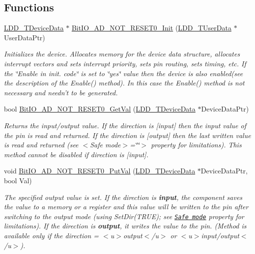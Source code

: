 \subsection*{Functions}
\begin{DoxyCompactItemize}
\item 
\hyperlink{group___p_e___types__module_gac5cf1362f1f0e3a2ce71b1bf2276d091}{L\-D\-D\-\_\-\-T\-Device\-Data} $\ast$ \hyperlink{group___bit_i_o___a_d___n_o_t___r_e_s_e_t0__module_gab0dee5e91bce634f9f86a6c6bedbae51}{Bit\-I\-O\-\_\-\-A\-D\-\_\-\-N\-O\-T\-\_\-\-R\-E\-S\-E\-T0\-\_\-\-Init} (\hyperlink{group___p_e___types__module_ga0b66a73f87238a782318aa0be7578e35}{L\-D\-D\-\_\-\-T\-User\-Data} $\ast$User\-Data\-Ptr)
\begin{DoxyCompactList}\small\item\em Initializes the device. Allocates memory for the device data structure, allocates interrupt vectors and sets interrupt priority, sets pin routing, sets timing, etc. If the \char`\"{}\-Enable
    in init. code\char`\"{} is set to \char`\"{}yes\char`\"{} value then the device is also enabled(see the description of the Enable() method). In this case the Enable() method is not necessary and needn't to be generated. \end{DoxyCompactList}\item 
bool \hyperlink{group___bit_i_o___a_d___n_o_t___r_e_s_e_t0__module_gaf0c8c2b99922b88ca2cb0cf05a31c839}{Bit\-I\-O\-\_\-\-A\-D\-\_\-\-N\-O\-T\-\_\-\-R\-E\-S\-E\-T0\-\_\-\-Get\-Val} (\hyperlink{group___p_e___types__module_gac5cf1362f1f0e3a2ce71b1bf2276d091}{L\-D\-D\-\_\-\-T\-Device\-Data} $\ast$Device\-Data\-Ptr)
\begin{DoxyCompactList}\small\item\em Returns the input/output value. If the direction is \mbox{[}input\mbox{]} then the input value of the pin is read and returned. If the direction is \mbox{[}output\mbox{]} then the last written value is read and returned (see $<$\-Safe mode$>$=\char`\"{}\char`\"{}$>$ property for limitations). This method cannot be disabled if direction is \mbox{[}input\mbox{]}. \end{DoxyCompactList}\item 
void \hyperlink{group___bit_i_o___a_d___n_o_t___r_e_s_e_t0__module_gabd577069a3194532beee8d0523c40f43}{Bit\-I\-O\-\_\-\-A\-D\-\_\-\-N\-O\-T\-\_\-\-R\-E\-S\-E\-T0\-\_\-\-Put\-Val} (\hyperlink{group___p_e___types__module_gac5cf1362f1f0e3a2ce71b1bf2276d091}{L\-D\-D\-\_\-\-T\-Device\-Data} $\ast$Device\-Data\-Ptr, bool Val)
\begin{DoxyCompactList}\small\item\em The specified output value is set. If the direction is {\bfseries  input}, the component saves the value to a memory or a register and this value will be written to the pin after switching to the output mode (using {\ttfamily Set\-Dir(\-T\-R\-U\-E)}; see \href{BitIOProperties.html#SafeMode}{\tt Safe mode} property for limitations). If the direction is {\bfseries output}, it writes the value to the pin. (Method is available only if the direction = $<$u$>${\ttfamily output}$<$/u$>$ or $<$u$>${\ttfamily  input/output}$<$/u$>$). \end{DoxyCompactList}\item 

\end{DoxyCompactItemize}
